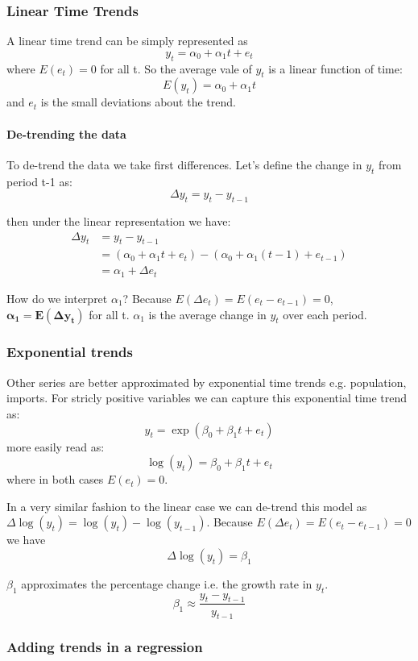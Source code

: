 \documentclass[11pt]{article}
\begin{document}
\subsubsection{Linear Time Trends}

A linear time trend can be simply represented as
\[y_t = \alpha_0 + \alpha_1 t + e_t\]
where $E(e_t) = 0$ for all t. So the average vale of $y_t$ is a linear function of time:
\[E(y_t) = \alpha_0 + \alpha_1 t\]
and $e_t$ is the small deviations about the trend.

\paragraph{De-trending the data}
To de-trend the data we take first differences. Let's define the change in $y_t$ from period t-1 as:
\[\Delta y_t = y_t - y_{t-1}\]

then under the linear representation we have:
\begin{align*}
    \Delta y_t &= y_t - y_{t-1} \\
                &= (\alpha_0 + \alpha_1 t + e_t) - (\alpha_0 + \alpha_1 (t-1) + e_{t-1}) \\
                &= \alpha_1 + \Delta e_t
\end{align*}

How do we interpret $\alpha_1$? Because $E(\Delta e_t) = E(e_t - e_{t-1}) = 0$, $\boldsymbol{\alpha_1 = E(\Delta y_t)}$ for all t. $\alpha_1$ is the average change in $y_t$ over each period.

\subsubsection{Exponential trends}

Other series are better approximated by exponential time trends e.g. population, imports. For stricly positive variables we can capture this exponential time trend as:
\[y_t = \exp (\beta_0 + \beta_1 t + e_t)\]
more easily read as:
\[\log (y_t) = \beta_0 + \beta_1 t + e_t\]
where in both cases $E(e_t) = 0$.

In a very similar fashion to the linear case we can de-trend this model as $\Delta \log (y_t) = \log (y_t) - \log (y_{t-1})$. Because $E(\Delta e_t) = E(e_t - e_{t-1}) = 0$ we have 
\[\Delta \log (y_t) = \beta_1\]

$\beta_1$ approximates the percentage change i.e. the growth rate in $y_t$. 
\[\beta_1 \approx \dfrac{y_t - y_{t-1}}{y_{t-1}}\]

\subsubsection{Adding trends in a regression}
\end{document}
